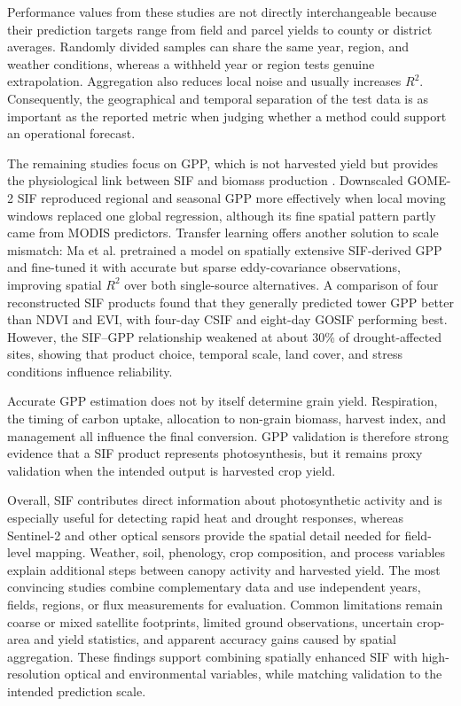 Performance values from these studies are not directly interchangeable because their prediction targets range from field and parcel yields to county or district averages. Randomly divided samples can share the same year, region, and weather conditions, whereas a withheld year or region tests genuine extrapolation. Aggregation also reduces local noise and usually increases $R^2$. Consequently, the geographical and temporal separation of the test data is as important as the reported metric when judging whether a method could support an operational forecast.

The remaining studies focus on GPP, which is not harvested yield but provides the physiological link between SIF and biomass production \cite{hu2020detecting}\cite{ma2025gpp}\cite{shekhar2022well}. Downscaled GOME-2 SIF reproduced regional and seasonal GPP more effectively when local moving windows replaced one global regression, although its fine spatial pattern partly came from MODIS predictors. Transfer learning offers another solution to scale mismatch: Ma et al. pretrained a model on spatially extensive SIF-derived GPP and fine-tuned it with accurate but sparse eddy-covariance observations, improving spatial $R^2$ over both single-source alternatives. A comparison of four reconstructed SIF products found that they generally predicted tower GPP better than NDVI and EVI, with four-day CSIF and eight-day GOSIF performing best. However, the SIF--GPP relationship weakened at about 30\% of drought-affected sites, showing that product choice, temporal scale, land cover, and stress conditions influence reliability.

Accurate GPP estimation does not by itself determine grain yield. Respiration, the timing of carbon uptake, allocation to non-grain biomass, harvest index, and management all influence the final conversion. GPP validation is therefore strong evidence that a SIF product represents photosynthesis, but it remains proxy validation when the intended output is harvested crop yield.

Overall, SIF contributes direct information about photosynthetic activity and is especially useful for detecting rapid heat and drought responses, whereas Sentinel-2 and other optical sensors provide the spatial detail needed for field-level mapping. Weather, soil, phenology, crop composition, and process variables explain additional steps between canopy activity and harvested yield. The most convincing studies combine complementary data and use independent years, fields, regions, or flux measurements for evaluation. Common limitations remain coarse or mixed satellite footprints, limited ground observations, uncertain crop-area and yield statistics, and apparent accuracy gains caused by spatial aggregation. These findings support combining spatially enhanced SIF with high-resolution optical and environmental variables, while matching validation to the intended prediction scale.

